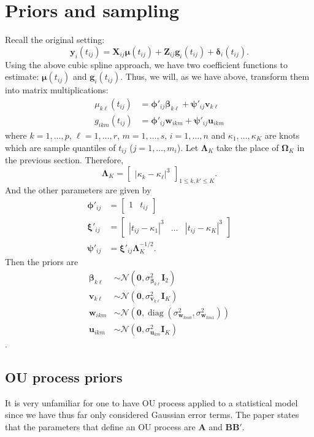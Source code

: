 \documentclass[11pt]{article}
\newcommand{\bs}{\boldsymbol}
\newcommand{\opn}{\operatorname}
\begin{document}
\section{Priors and sampling}
Recall the original setting:
\begin{equation}
  \bs{y}_{i}\left(t_{ij}\right) = \bs{X}_{ij}\bs{\mu}\left(t_{ij}\right) + \bs{Z}_{ij}\bs{g}_{i}\left(t_{ij}\right) + \bs{\delta}_{i}\left(t_{ij}\right).
\end{equation}
Using the above cubic spline approach, we have two coefficient functions to estimate: $\bs{\mu}\left(t_{ij}\right)$ and $\bs{g}_{i}\left(t_{ij}\right)$. Thus, we will, as we have above, transform them into matrix multiplications:
\begin{align}
  \mu_{k\ell}\left(t_{ij}\right) &= \bs{\phi}'_{ij}\bs{\beta}_{k\ell} + \bs{\psi}'_{ij}\bs{v}_{k\ell}\\
  g_{ikm}\left(t_{ij}\right) &= \bs{\phi}'_{ij}\bs{w}_{ikm} + \bs{\psi}'_{ij}\bs{u}_{ikm}
\end{align}
where $k = 1,\ldots , p$, $\ell = 1, \ldots , r$, $m = 1,\ldots, s$, $i = 1,\ldots , n$ and $\kappa_{1},\ldots , \kappa_{K}$ are knots which are sample quantiles of $t_{ij}$ ($j=1,\ldots , m_{i}$). Let $\bs{\Lambda}_{K}$ take the place of $\bs{\Omega}_{K}$ in the previous section. Therefore,
\begin{equation}
  \bs{\Lambda}_{K} = \begin{bmatrix} \left| \kappa_{k}-\kappa_{\ell}\right|^{3}\end{bmatrix}_{1\leq k, k'\leq K}.
\end{equation}
And the other parameters are given by
\begin{align}
  \bs{\phi}'_{ij} &= \begin{bmatrix}1 & t_{ij} \end{bmatrix}\\
  \bs{\xi}'_{ij} &= \begin{bmatrix} \left|t_{ij}-\kappa_{1}\right|^{3} & \ldots  & \left|t_{ij}-\kappa_{K}\right|^{3}\end{bmatrix}\\
  \bs{\psi}'_{ij} &= \bs{\xi}'_{ij}\bs{\Lambda}_{K}^{-1/2}.
\end{align}
Then the priors are
\begin{align}
  \bs{\beta}_{k\ell} &\sim \mathcal{N}\left(\bs{0}, \sigma_{\bs{\beta}_{k\ell}}^{2}\bs{I}_{2}\right)\\
  \bs{v}_{k\ell} &\sim \mathcal{N}\left(\bs{0}, \sigma_{\bs{v}_{k\ell}}^{2}\bs{I}_{K}\right)\\
  \bs{w}_{ikm} &\sim \mathcal{N}\left(\bs{0}, \opn{diag}\left(\sigma_{\bs{w}_{km0}}^{2}, \sigma_{\bs{w}_{km1}}^{2}\right)\right)\\
  \bs{u}_{ikm} &\sim \mathcal{N}\left(\bs{0}, \sigma_{\bs{u}_{km}}^{2}\bs{I}_{K} \right)
\end{align}.
\subsection{OU process priors}
It is very unfamiliar for one to have OU process applied to a statistical model since we have thus far only considered Gaussian error terms. The paper states that the parameters that define an OU process are $\bs{A}$ and $\bs{BB}'$. 
\end{document}
